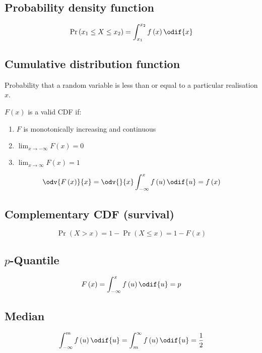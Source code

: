 \documentclass{article}
\begin{document}
\begin{minipage}{126.1962963mm}
\begin{multicols}{2}
        \subsection{Probability density function}
        \begin{equation*}
            \Pr{\left( x_1 \leq X \leq x_2 \right)} = \int_{x_1}^{x_2} f\left( x \right) \odif{x}
        \end{equation*}
        \subsection{Cumulative distribution function}
        Probability that a random variable is
        less than or equal to a particular realisation \(x\).

        \(F\left( x \right)\) is a valid CDF if:
        \begin{enumerate}
            \item \(F\) is monotonically increasing and continuous
            \item \(\lim_{x \to -\infty} F\left( x \right) = 0\)
            \item \(\lim_{x \to \infty} F\left( x \right) = 1\)
        \end{enumerate}
        \begin{equation*}
            \odv{F\left( x \right)}{x} = \odv{}{x} \int_{-\infty}^x f\left( u \right) \odif{u} = f\left( x \right)
        \end{equation*}
        \subsection{Complementary CDF (survival)}
        \begin{equation*}
            \Pr{\left( X > x \right)} = 1 - \Pr{\left( X \leq x \right)} = 1 - F\left( x \right)
        \end{equation*}
        \subsection{\texorpdfstring{\(p\)}{p}-Quantile}
        \begin{equation*}
            F\left( x \right) = \int_{-\infty}^x f\left( u \right) \odif{u} = p
        \end{equation*}
        \subsection{Median}
        \begin{equation*}
            \int_{-\infty}^m f\left( u \right) \odif{u} = \int^{\infty}_m f\left( u \right) \odif{u} = \frac{1}{2}
        \end{equation*}

\end{multicols}
\end{minipage}
\end{document}
